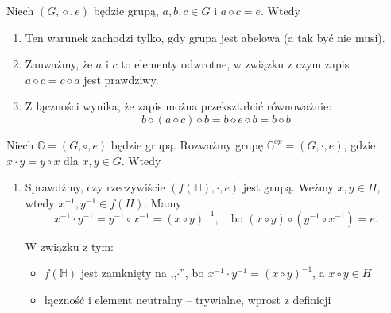 \begin{solutions}
    \sol Niech $(G, \diamond, e)$ będzie grupą, $a, b, c \in G$ i $a \diamond c = e$. Wtedy

    \begin{enumerate}[\bf A.]
        \item Ten warunek zachodzi tylko, gdy grupa jest abelowa (a tak być nie musi).
        
        \item Zauważmy, że $a$ i $c$ to elementy odwrotne, w związku z czym zapis $a \diamond c = c \diamond a$ jest prawdziwy.

        \item Z łączności wynika, że zapis można przekształcić równoważnie:
        $$b \diamond (a \diamond c) \diamond b = b \diamond e \diamond b = b \diamond b$$ 
    \end{enumerate}
    
    \sol Niech $\mathbb{G}=(G, \circ, e)$ będzie grupą. Rozważmy grupę $\mathbb{G}^{op}=(G, \cdot, e)$, gdzie $x \cdot y = y \circ x$ dla $x,y \in G$. Wtedy

    \begin{enumerate}[\bf A.]
        \item 
            Sprawdźmy, czy rzeczywiście $(f(\mathbb{H}), \cdot, e)$ jest grupą. Weźmy $x, y \in H$, wtedy $x^{-1}, y^{-1} \in f(H)$. Mamy
            $$x^{-1} \cdot y^{-1} = y^{-1} \circ x^{-1} = (x \circ y)^{-1},
            \quad \text{bo } (x \circ y) \circ (y^{-1} \circ x^{-1}) = e.$$

            W związku z tym:            
            \begin{itemize}
                \item $f(\mathbb{H})$ jest zamknięty na ,,$\cdot$'', bo $x^{-1} \cdot y^{-1} = (x \circ y)^{-1}$, a $x \circ y \in H$

                \item łączność i element neutralny -- trywialne, wprost z definicji


\end{itemize}
\end{enumerate}
\end{solutions}
